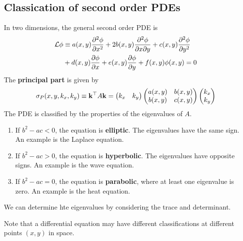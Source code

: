 \documentclass[a4paper]{article}
\begin{document}
\subsection{Classication of second order PDEs}
In two dimensions, the general second order PDE is
\begin{align*}
	\mathcal L \phi & \equiv a(x,y) \pdv[2]{\phi}{x} + 2 b(x,y) \pdv{\phi}{x}{y} + c(x,y) \pdv[2]{\phi}{y} \\
	                & + d(x,y) \pdv{\phi}{x} + e(x,y) \pdv{\phi}{y} + f(x,y) \phi(x,y)=0
\end{align*}
The \textbf{principal part} is given by
\[
	\sigma_P (x,y,k_x,k_y) \equiv {\bf k}^\top A {\bf k} = \begin{pmatrix}
		k_x & k_y
	\end{pmatrix} \begin{pmatrix}
		a(x,y) & b(x,y) \\
		b(x,y) & c(x,y)
	\end{pmatrix} \begin{pmatrix}
		k_x \\ k_y
	\end{pmatrix}
\]
The PDE is classified by the properties of the eigenvalues of \( A \).
\begin{enumerate}
	\item If \( b^2 - ac < 0 \), the equation is \textbf{elliptic}.
	      The eigenvalues have the same sign.
	      An example is the Laplace equation.
	\item If \( b^2 - ac > 0 \), the equation is \textbf{hyperbolic}.
	      The eigenvalues have opposite signs.
	      An example is the wave equation.
	\item If \( b^2 - ac = 0 \), the equation is \textbf{parabolic}, where at least one eigenvalue is zero.
	      An example is the heat equation.
\end{enumerate}
We can determine hte eigenvalues by considering the trace and determinant. 

Note that a differential equation may have different classifications at different points \( (x,y) \) in space.
\end{document}
